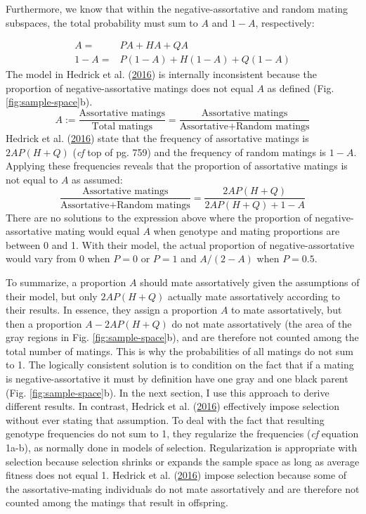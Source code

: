 \documentclass[
]{article}
\begin{document}
Furthermore, we know that within the negative-assortative and random mating subspaces, the total probability must sum to \(A\) and \(1 - A\), respectively:

\begin{align*}
  A = & PA + HA + QA \\
  1 - A = & P (1 - A) + H (1 - A) + Q (1 - A)
\end{align*}
The model in Hedrick et al. (\protect\hyperlink{ref-hedrick_negative-assortative_2016}{2016}) is internally inconsistent because the proportion of negative-assortative matings does not equal \(A\) as defined (Fig. \ref{fig:sample-space}b).
\[A := \frac{\textrm{Assortative matings}}{\textrm{Total matings}} =\frac{\textrm{Assortative matings}}{\textrm{Assortative} + \textrm{Random matings}}\]
Hedrick et al. (\protect\hyperlink{ref-hedrick_negative-assortative_2016}{2016}) state that the frequency of assortative matings is \(2 A P (H + Q)\) (\emph{cf} top of pg. 759) and the frequency of random matings is \(1 - A\). Applying these frequencies reveals that the proportion of assortative matings is not equal to \(A\) as assumed:
\[ \frac{\textrm{Assortative matings}}{\textrm{Assortative} + \textrm{Random matings}} = \frac{2 A P (H + Q)}{2 A P (H + Q) + 1 - A}\]
There are no solutions to the expression above where the proportion of negative-assortative mating would equal \(A\) when genotype and mating proportions are between 0 and 1. With their model, the actual proportion of negative-assortative would vary from 0 when \(P = 0\) or \(P = 1\) and \(A / (2 - A)\) when \(P = 0.5\).

To summarize, a proportion \(A\) should mate assortatively given the assumptions of their model, but only \(2 AP(H+Q)\) actually mate assortatively according to their results. In essence, they assign a proportion \(A\) to mate assortatively, but then a proportion \(A - 2 AP(H+Q)\) do not mate assortatively (the area of the gray regions in Fig. \ref{fig:sample-space}b), and are therefore not counted among the total number of matings. This is why the probabilities of all matings do not sum to 1. The logically consistent solution is to condition on the fact that if a mating is negative-assortative it must by definition have one gray and one black parent (Fig. \ref{fig:sample-space}b). In the next section, I use this approach to derive different results. In contrast, Hedrick et al. (\protect\hyperlink{ref-hedrick_negative-assortative_2016}{2016}) effectively impose selection without ever stating that assumption. To deal with the fact that resulting genotype frequencies do not sum to 1, they regularize the frequencies (\emph{cf} equation 1a-b), as normally done in models of selection. Regularization is appropriate with selection because selection shrinks or expands the sample space as long as average fitness does not equal 1. Hedrick et al. (\protect\hyperlink{ref-hedrick_negative-assortative_2016}{2016}) impose selection because some of the assortative-mating individuals do not mate assortatively and are therefore not counted among the matings that result in offspring.
\end{document}
